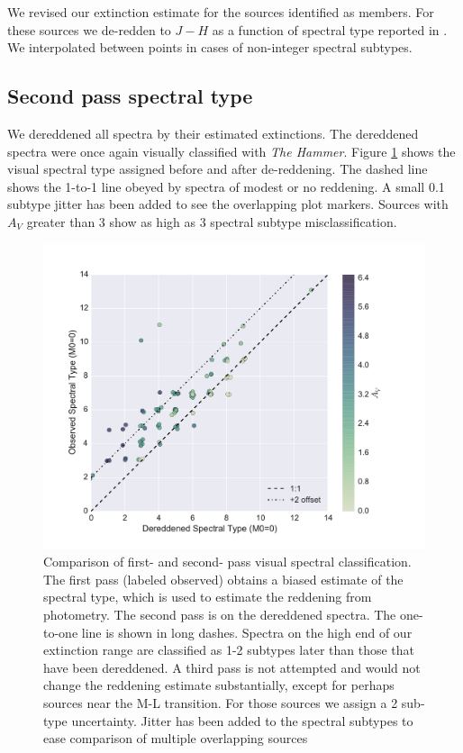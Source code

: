 We revised our extinction estimate for the sources identified as members.  For these sources we de-redden to $J-H$ as a function of spectral type reported in \citet{2013ApJS..208....9P}.  We interpolated between points in cases of non-integer spectral subtypes.

\subsection{Second pass spectral type}
We dereddened all spectra by their estimated extinctions.  The dereddened spectra were once again visually classified with \emph{The Hammer}.  Figure \ref{fig_dereddened_comparison} shows the visual spectral type assigned before and after de-reddening.  The dashed line shows the 1-to-1 line obeyed by spectra of modest or no reddening.  A small 0.1 subtype jitter has been added to see the overlapping plot markers.  Sources with $A_V$ greater than 3 show as high as 3 spectral subtype misclassification.

\begin{figure}[ht!]
\caption{Comparison of first- and second- pass visual spectral classification.  The first pass (labeled observed) obtains a biased estimate of the spectral type, which is used to estimate the reddening from photometry.  The second pass is on the dereddened spectra.  The one-to-one line is shown in long dashes.  Spectra on the high end of our extinction range are classified as 1-2 subtypes later than those that have been dereddened.  A third pass is not attempted and would not change the reddening estimate substantially, except for perhaps sources near the M-L transition.  For those sources we assign a 2 sub-type uncertainty.  Jitter has been added to the spectral subtypes to ease comparison of multiple overlapping sources \label{fig_dereddened_comparison} }
\centering
\includegraphics[scale=0.5]{chIMACS/figures/dereddened_spt_comparison}
\end{figure}


